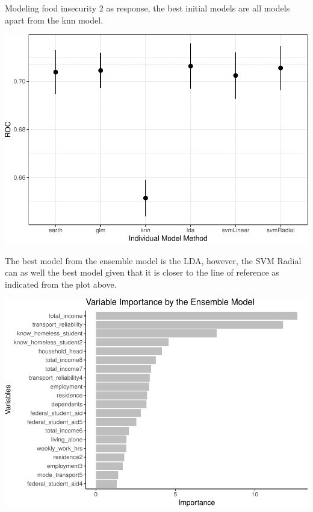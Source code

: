 \documentclass[
  10pt,
]{article}
\begin{document}
Modeling food insecurity 2 as response, the best initial models are all models apart from the knn model.\\

\begin{center}\includegraphics{phase2_report_files/figure-latex/unnamed-chunk-22-1} \end{center}

The best model from the ensemble model is the LDA, however, the SVM Radial can as well the best model given that it is closer to the line of reference as indicated from the plot above.\\

\begin{center}\includegraphics{phase2_report_files/figure-latex/unnamed-chunk-23-1} \end{center}
\end{document}
